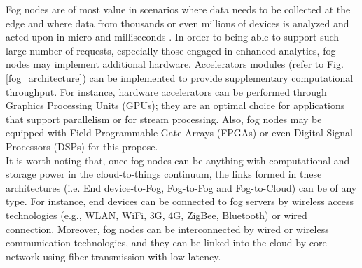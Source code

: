\noindent\tab Fog nodes are of most value in scenarios where data needs to be collected at the edge and where data from thousands or even millions of devices is analyzed and acted upon in micro and milliseconds \cite{openfog2017openfog}. In order to being able to support such large number of requests, especially those engaged in enhanced analytics, fog nodes may implement additional hardware. Accelerators modules (refer to Fig. \ref{fog_architecture}) can be implemented to provide supplementary computational throughput. For instance, hardware accelerators can be performed through Graphics Processing Units (GPUs); they are an optimal choice for applications that support parallelism or for stream processing. Also, fog nodes may be equipped with Field Programmable Gate Arrays (FPGAs) or even Digital Signal Processors (DSPs) for this propose.\\
\noindent\tab It is worth noting that, once fog nodes can be anything with computational and storage power in the cloud-to-things continuum, the links formed in these architectures (i.e. End device-to-Fog, Fog-to-Fog and Fog-to-Cloud) can be of any type. For instance, end devices can be connected to fog servers by wireless access technologies (e.g., WLAN, WiFi, 3G, 4G, ZigBee, Bluetooth) or wired connection. Moreover, fog nodes can be interconnected by wired or wireless communication technologies, and they can be linked into the cloud by core network using fiber transmission with low-latency.\\
